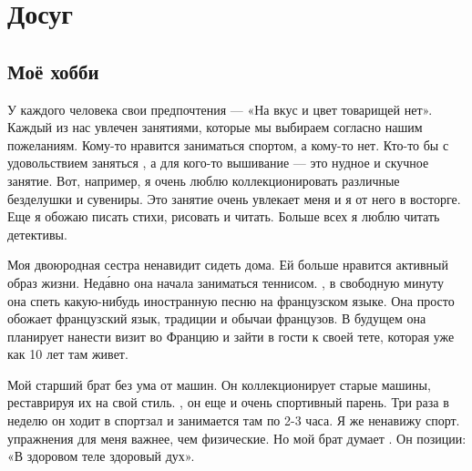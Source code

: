 \chapter{Досуг}

\section{Моё хобби}
У каждого человека свои предпочтения --- «На вкус и цвет товарищей нет». Каждый из нас увлечен занятиями, которые мы выбираем согласно нашим пожеланиям. Кому-то нравится заниматься спортом, а кому-то нет. Кто-то бы с удовольствием заняться , а для кого-то вышивание --- это нудное и скучное занятие.
Вот, например, я очень люблю коллекционировать различные безделушки и сувениры. Это занятие очень увлекает меня и я от него в восторге. Еще я обожаю писать стихи, рисовать и читать. Больше всех я люблю читать детективы.

Моя двоюродная сестра ненавидит сидеть дома. Ей больше нравится активный образ жизни. Нед\'{а}вно она начала заниматься теннисом. , в свободную минуту она  спеть какую-нибудь иностранную песню на французском языке. Она просто обожает французский язык, традиции и обычаи французов. В будущем она планирует нанести визит во Францию и зайти в гости к своей тете, которая уже как 10 лет там живет.

Мой старший брат без ума от машин. Он коллекционирует старые машины, реставрируя их на свой стиль. , он еще и очень спортивный парень. Три раза в неделю он ходит в спортзал и занимается там по 2-3 часа. Я же ненавижу спорт.  упражнения для меня важнее, чем физические. Но мой брат думает . Он  позиции: «В здоровом теле здоровый дух».